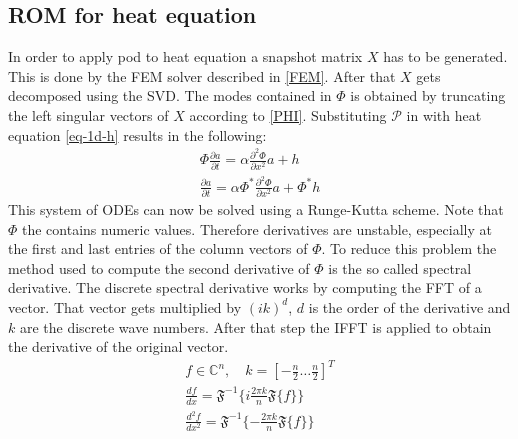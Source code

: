 \subsection{ROM for heat equation}
In order to apply pod to heat equation a snapshot matrix \(X\) has to be generated.
This is done by the FEM solver described in \ref{FEM}.
After that \(X\) gets decomposed using the SVD.
The modes contained in \(\Phi\) is obtained by truncating the left singular vectors of \(X\) according to \ref{PHI}.
Substituting \(\mathscr{P}\) in \label{label-u-aprox} with heat equation \ref{eq-1d-h} results in the following:
\begin{gather}
\Phi \frac{\partial a}{\partial t}  = \alpha \frac{\partial^{2} \Phi}{\partial x^{2}} a + h\\
\frac{\partial a}{\partial t} = \alpha \Phi^{*}  \frac{\partial^{2} \Phi}{\partial x^{2}} a + \Phi^{*}h
\end{gather}
This system of ODEs can now be solved using a Runge-Kutta scheme.
Note that \(\Phi\) the contains numeric values.
Therefore derivatives are unstable, especially at the first and last entries of the column vectors of \(\Phi\).
To reduce this problem the method used to compute the second derivative of \(\Phi\) is the so called spectral derivative.
The discrete spectral derivative works by computing the FFT of a vector.
That vector gets multiplied by \((ik)^{d}\), \(d\) is the order of the derivative and \(k\) are the discrete wave numbers.
After that step the IFFT is applied to obtain the derivative of the original vector.
\begin{gather}
f \in \mathbb{C}^{n}, \quad k = [-\frac{n}{2} \hdots \frac{n}{2}]^{T} \\
\frac{df}{dx} = \mathfrak{F}^{-1}\{i \frac{2 \pi k}{n} \mathfrak{F}\{f\}\} \\
\frac{d^{2}f}{dx^{2}} = \mathfrak{F}^{-1}\{-\frac{2 \pi k}{n} \mathfrak{F}\{f\}\} \\
\end{gather}
\cite{brunton_kutz_2019f}


